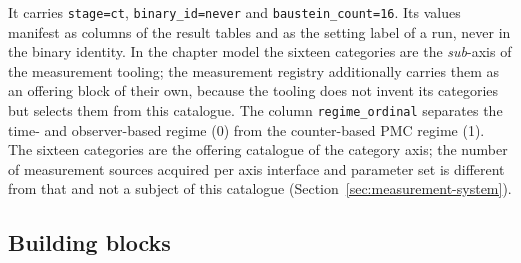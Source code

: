 It carries \texttt{stage=ct}, \texttt{binary\_\allowbreak{}id=never} and \texttt{baustein\_\allowbreak{}count=16}. Its values manifest as columns of the result tables and as the setting label of a run, never in the binary identity. In the chapter model the sixteen categories are the \emph{sub}-axis of the measurement tooling; the measurement registry additionally carries them as an offering block of their own, because the tooling does not invent its categories but selects them from this catalogue. The column \texttt{regime\_\allowbreak{}ordinal} separates the time- and observer-based regime (0) from the counter-based PMC regime (1). The sixteen categories are the offering catalogue of the category axis; the number of measurement sources acquired per axis interface and parameter set is different from that and not a subject of this catalogue (Section~\ref{sec:measurement-system}).

\subsection*{Building blocks}

